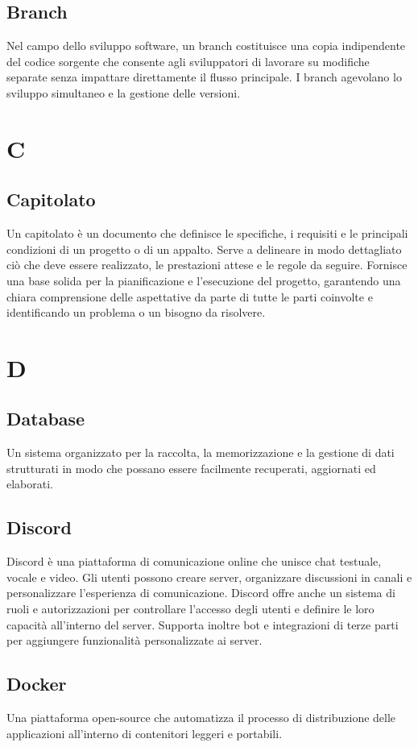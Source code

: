 \documentclass[8pt]{article}
\begin{document}
	\subsection*{Branch}
	Nel campo dello sviluppo software, un branch costituisce una copia indipendente del codice sorgente che consente agli sviluppatori di lavorare su modifiche separate senza impattare direttamente il flusso principale. I branch agevolano lo sviluppo simultaneo e la gestione delle versioni.
	\newpage
	\section*{C}
	\subsection*{Capitolato}
	Un capitolato è un documento che definisce le specifiche, i requisiti e le principali condizioni di un progetto o di un appalto. Serve a delineare in modo dettagliato ciò che deve essere realizzato, le prestazioni attese e le regole da seguire. Fornisce una base solida per la pianificazione e l'esecuzione del progetto, garantendo una chiara comprensione delle aspettative da parte di tutte le parti coinvolte e identificando un problema o un bisogno da risolvere.
	\newpage
	\section*{D}
	\subsection*{Database}
	Un sistema organizzato per la raccolta, la memorizzazione e la gestione di dati strutturati in modo che possano essere facilmente recuperati, aggiornati ed elaborati.
	\subsection*{Discord}
	Discord è una piattaforma di comunicazione online che unisce chat testuale, vocale e video. Gli utenti possono creare server, organizzare discussioni in canali e personalizzare l'esperienza di comunicazione. Discord offre anche un sistema di ruoli e autorizzazioni per controllare l'accesso degli utenti e definire le loro capacità all'interno del server. Supporta inoltre bot e integrazioni di terze parti per aggiungere funzionalità personalizzate ai server.
	\subsection*{Docker}
	Una piattaforma open-source che automatizza il processo di distribuzione delle applicazioni all'interno di contenitori leggeri e portabili.
\end{document}
